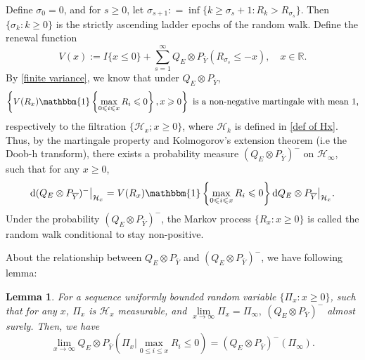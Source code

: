 \documentclass[]{article}
\numberwithin{equation}{section}
\theoremstyle{thmstyleone}%
\theoremstyle{thmstyletwo}%
\theoremstyle{thmstylethree}%
\theoremstyle{thmstylefour}%
\newtheorem{lemma}{Lemma}
\theoremstyle{thmstylefive}%
\theoremstyle{thmstylesix}%
\renewcommand{\d}{\mathrm{d}}
\newcommand{\R}{\mathbb{R}}
\newcommand{\ind}[1]{\mathbbm{1}\left\{ #1\right\}}
\begin{document}
	Define $\sigma_0=0$, and for $s\geqslant0$, let
	$\sigma_{s+1}: = \inf\{k\geqslant \sigma_s+1:R_k > R_{\sigma_s}\}$.
	Then $\{\sigma_k:k\geqslant0\}$ is the strictly ascending ladder epochs of the random walk.
	Define the renewal function
	\begin{equation}
		V(x) := I\{x\leqslant 0\} +\sum_{s=1}^{\infty} Q_E\otimes P_{\overline{Y}} \left(
		R_{\sigma_s}\leqslant -x
		\right), \quad  x\in \R.
	\end{equation}
	By \cref{finite variance}, we know that under $Q_E\otimes P_{\overline{Y}}$,
	\begin{equation*}
		\left\{V(R_x) \ind{\max\limits_{0\leqslant i\leqslant x} R_i \leqslant 0},x\geqslant 0\right\} ~\text{is a non-negative martingale with mean $1$,}
	\end{equation*}
	respectively to the filtration $\{\mathcal{H}_x;x\geqslant 0\}$, where $\mathcal{H}_k$ is defined in \cref{def of Hx}.
	Thus, by the martingale property and Kolmogorov's extension theorem (i.e the Doob-h transform), there exists a probability measure $(Q_E\otimes P_{\overline{Y}})^{-}$ on $\mathcal{H}_\infty$, such that for any $x\geqslant 0$,
	\begin{equation}
		\d (Q_E\otimes P_{\overline{Y}})^{-} \big|_{\mathcal{H}_x} = V(R_x) \ind{\max\limits_{0\leqslant i\leqslant x} R_i \leqslant 0} \d Q_E\otimes P_{\overline{Y}} \big|_{\mathcal{H}_x}.
	\end{equation}
	Under the probability $ (Q_E\otimes P_{\overline{Y}})^{-} $, the Markov process $\{R_x:x\geqslant0\}$ is called the random walk conditional to stay non-positive.
	
	About the relationship between $Q_E\otimes P_{\overline{Y}}$ and $
	\left(Q_E\otimes P_{\overline{Y}}\right)^-$, we have following lemma:
	
	\begin{lemma}\label{lemma2 for intermediately}
		For a sequence uniformly bounded random variable $ \{\Pi_x:x\geqslant 0\} $, such that
		for any $x$, $\Pi_x$ is $\mathcal{H}_x$ measurable, and $\lim\limits_{x\rightarrow\infty}\Pi_x = \Pi_\infty,~ (Q_E\otimes P_{\overline{Y}})^- $ almost surely.
		Then, we have
		\begin{equation}
			\lim\limits_{x\rightarrow\infty}Q_E\otimes P_{\overline{Y}} \left( \Pi_x \big| \max\limits_{0\leqslant i\leqslant x} R_i \leqslant 0 \right)
			=
			(Q_E\otimes P_{\overline{Y}})^{-} ( \Pi_\infty ).
		\end{equation}
	\end{lemma}
	
\end{document}
